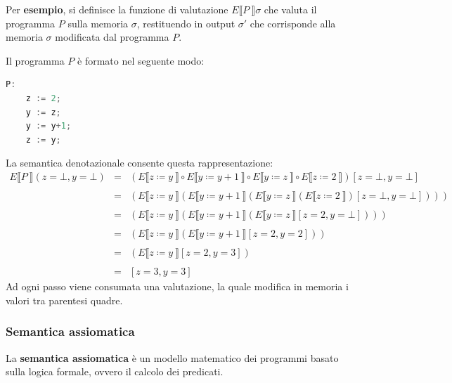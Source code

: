 \documentclass[a4paper]{article}
\newcommand{\exec}[1]{\llbracket #1\:\rrbracket}
\begin{document}
	\noindent
	Per \textcolor{Green4}{\textbf{esempio}}, si definisce la funzione di valutazione $E\exec{P}\sigma$ che valuta il programma $P$ sulla memoria $\sigma$, restituendo in output $\sigma'$ che corrisponde alla memoria $\sigma$ modificata dal programma $P$.\newline
	
	\noindent
	Il programma $P$ è formato nel seguente modo:
\begin{lstlisting}[language=C]
P:
	z := 2;
	y := z;
	y := y+1;
	z := y;\end{lstlisting}
	La semantica denotazionale consente questa rappresentazione:
	\begin{equation*}
		\begin{array}{lll}
			E\exec{P}\left(z = \bot, y = \bot\right) & = & \left(E\exec{ z \coloneq y } \circ E\exec{ y \coloneq y+1 } \circ E\exec{ y \coloneq z } \circ E\exec{ z \coloneq 2 }\right) \left[z = \bot, y = \bot\right] \\
			\\
			&=& \left(E\exec{ z \coloneq y } \left( E\exec{ y \coloneq y+1 } \left( E\exec{ y \coloneq z } \left( E\exec{ z \coloneq 2 } \right) \left[z = \bot, y = \bot\right]\right)\right)\right) \\
			\\
			&=& \left(E\exec{ z \coloneq y } \left( E\exec{ y \coloneq y+1 } \left( E\exec{ y \coloneq z } \left[z = 2, y = \bot\right]\right)\right)\right) \\
			\\
			&=& \left(E\exec{ z \coloneq y } \left( E\exec{ y \coloneq y+1 } \left[z = 2, y = 2\right]\right)\right) \\
			\\
			&=& \left(E\exec{ z \coloneq y } \left[z = 2, y = 3\right]\right) \\
			\\
			&=& \left[z = 3, y = 3\right]
		\end{array}
	\end{equation*}
	Ad ogni passo viene consumata una valutazione, la quale modifica in memoria i valori tra parentesi quadre.\newpage
	
	\subsubsection{Semantica assiomatica}
	
	La \textcolor{Red3}{\textbf{semantica assiomatica}} è un modello matematico dei programmi basato sulla logica formale, ovvero il calcolo dei predicati.\newline
	
\end{document}
